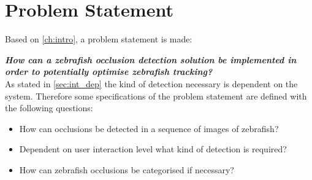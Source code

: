 \chapter{Problem Statement}
Based on \autoref{ch:intro}, a problem statement is made:

\textbf{\textit{How can a zebrafish occlusion detection solution be implemented in order to potentially optimise zebrafish tracking?}}\\

As stated in \autoref{sec:int_dep} the kind of detection necessary is dependent on the system. Therefore some specifications of the problem statement are defined with the following questions:
\begin{itemize}
	\item How can occlusions be detected in a sequence of images of zebrafish? %
	\item Dependent on user interaction level what kind of detection is required?
	\item How can zebrafish occlusions be categorised if necessary?
\end{itemize}


